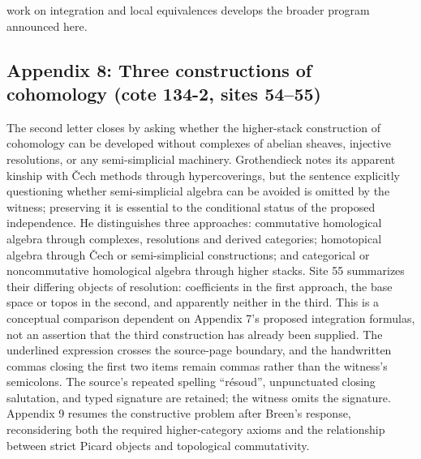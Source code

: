 \documentclass[10pt,oneside]{book}
\begin{document}
work on integration and local equivalences develops the broader program announced here.

\subsection*{Appendix 8: Three constructions of cohomology (cote 134-2, sites 54--55)}
The second letter closes by asking whether the higher-stack construction of cohomology can be developed without complexes of abelian sheaves, injective resolutions, or any semi-simplicial machinery. Grothendieck notes its apparent kinship with \v Cech methods through hypercoverings, but the sentence explicitly questioning whether semi-simplicial algebra can be avoided is omitted by the witness; preserving it is essential to the conditional status of the proposed independence. He distinguishes three approaches: commutative homological algebra through complexes, resolutions and derived categories; homotopical algebra through \v Cech or semi-simplicial constructions; and categorical or noncommutative homological algebra through higher stacks. Site 55 summarizes their differing objects of resolution: coefficients in the first approach, the base space or topos in the second, and apparently neither in the third. This is a conceptual comparison dependent on Appendix 7's proposed integration formulas, not an assertion that the third construction has already been supplied. The underlined expression crosses the source-page boundary, and the handwritten commas closing the first two items remain commas rather than the witness's semicolons. The source's repeated spelling ``résoud'', unpunctuated closing salutation, and typed signature are retained; the witness omits the signature. Appendix 9 resumes the constructive problem after Breen's response, reconsidering both the required higher-category axioms and the relationship between strict Picard objects and topological commutativity.
\end{document}
